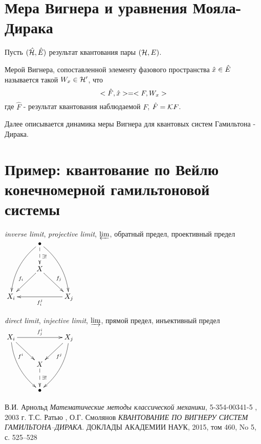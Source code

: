 \documentclass[10pt,a4paper]{article}
\begin{document}
\section{Мера Вигнера и уравнения Мояла-Дирака}

Пусть $(\hat{\mathcal{H}},\hat{E})$ результат квантования пары $(\mathcal{H},E)$.
\begin{definition}
Мерой Вигнера, сопоставленной элементу фазового пространства $\hat{x}\in \hat{E}$ называется такой $W_x\in \mathcal{H}'$, что 
\[<{\hat{F}},{\hat{x}}>=<{F},{W_x}>\]
где  $\hat{F}$ - результат квантования наблюдаемой $F$, $\hat{F}=\mathcal{K} F$.
\end{definition}

Далее описывается динамика меры Вигнера для квантовых систем Гамильтона - Дирака.

\section{Пример: квантование по Вейлю конечномерной гамильтоновой системы}
\begin{center}
\emph{inverse limit},
\newline \emph{projective limit},
\newline 
$\varprojlim$,
\newline обратный предел,
\newline проективный предел
\\
$\xymatrix{
 & \bullet\ar@{-->}[d]^{\exists!}\ar@/^1em/[ddr]\ar@/_1em/[ddl] & \\
 & X\ar[dr]^{f_j}\ar[dl]_{f_i} & \\
X_i & & X_j\ar[ll]^{f_i^j}
}$ 
\end{center}\begin{center}

\emph{direct limit},
\newline \emph{injective limit},
\newline $\varinjlim$,
\newline прямой предел,
\newline инъективный предел
\\
$\xymatrix{
X_i\ar[rr]^{f_j^i}\ar[dr]_{f^i}\ar@/_1em/[ddr] & & X_j\ar[dl]^{f^j}\ar@/^1em/[ddl] \\
 & X\ar@{-->}[d]^{\exists!} & \\
 & \bullet &
}$ \\
\end{center}




\begin{thebibliography}{9}
В.И. Арнольд
\textit{Математические методы классической механики},
5-354-00341-5 , 2003 г.
Т.С. Ратью , О.Г. Смолянов
\textit{КВАНТОВАНИЕ ПО ВИГНЕРУ СИСТЕМ ГАМИЛЬТОНА–ДИРАКА.}
ДОКЛАДЫ АКАДЕМИИ НАУК, 2015, том 460, No 5, с. 525–528

\end{thebibliography}
\end{document}
